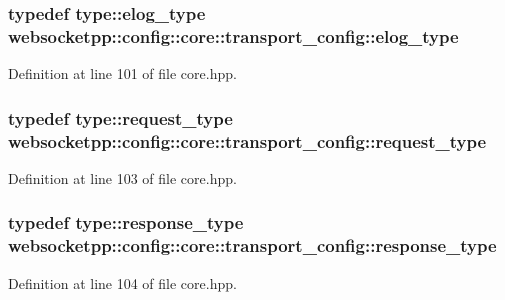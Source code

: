 \subsubsection[{elog\+\_\+type}]{\setlength{\rightskip}{0pt plus 5cm}typedef {\bf type\+::elog\+\_\+type} {\bf websocketpp\+::config\+::core\+::transport\+\_\+config\+::elog\+\_\+type}}\label{structwebsocketpp_1_1config_1_1core_1_1transport__config_ae7514c1c62b41184ec7133de469ab3ae}


Definition at line 101 of file core.\+hpp.

\hypertarget{structwebsocketpp_1_1config_1_1core_1_1transport__config_aab3b5759b5b1f8c06da99319612c061c}{}
\subsubsection[{request\+\_\+type}]{\setlength{\rightskip}{0pt plus 5cm}typedef {\bf type\+::request\+\_\+type} {\bf websocketpp\+::config\+::core\+::transport\+\_\+config\+::request\+\_\+type}}\label{structwebsocketpp_1_1config_1_1core_1_1transport__config_aab3b5759b5b1f8c06da99319612c061c}


Definition at line 103 of file core.\+hpp.

\hypertarget{structwebsocketpp_1_1config_1_1core_1_1transport__config_a93430d48551cc6d5cdee09d54840eb76}{}
\subsubsection[{response\+\_\+type}]{\setlength{\rightskip}{0pt plus 5cm}typedef {\bf type\+::response\+\_\+type} {\bf websocketpp\+::config\+::core\+::transport\+\_\+config\+::response\+\_\+type}}\label{structwebsocketpp_1_1config_1_1core_1_1transport__config_a93430d48551cc6d5cdee09d54840eb76}


Definition at line 104 of file core.\+hpp.



